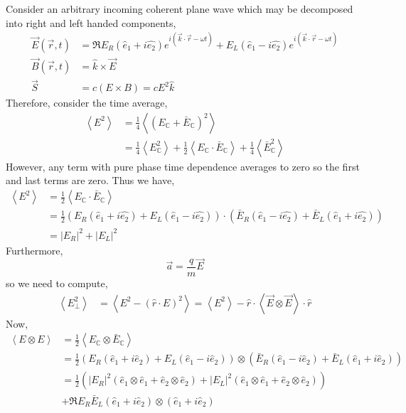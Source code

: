 \documentclass[12pt]{extarticle}
\theoremstyle{definition}
\newcommand{\C}{\mathbb{C}}
\begin{document}
Consider an arbitrary incoming coherent plane wave which may be decomposed into right and left handed components,
\begin{align*}
\vec{E}(\vec{r}, t) & = \Re{  E_R  (\hat{e}_1 + i \hat{e_2}) e^{i (\vec{k} \cdot \vec{r} - \omega t)} + E_L (\hat{e}_1 - i \hat{e_2}) e^{i (\vec{k} \cdot \vec{r} - \omega t)} }
\\
\vec{B}(\vec{r}, t) & = \hat{k} \times \vec{E}
\\
\vec{S} & = c ( E \times B) = c E^2 \hat{k} 
\end{align*}
Therefore, consider the time average,
\begin{align*}
\left< E^2 \right> & = \tfrac{1}{4} \left< (E_\C + \bar{E}_\C)^2 \right>
\\
& = \tfrac{1}{4} \left< E_\C^2 \right> + \tfrac{1}{2} \left< E_\C \cdot \bar{E}_\C \right> + \tfrac{1}{4} \left< \bar{E}_\C^2 \right>
\end{align*}
However, any term with pure phase time dependence averages to zero so the first and last terms are zero. Thus we have,
\begin{align*}
\left< E^2 \right> & = \tfrac{1}{2} \left< E_\C \cdot \bar{E}_\C \right> 
\\
& = \tfrac{1}{2} \left( E_R (\hat{e}_1 + i \hat{e_2})  + E_L (\hat{e}_1 - i \hat{e_2}) \right) \cdot \left( \bar{E}_R (\hat{e}_1 - i \hat{e_2})  + \bar{E}_L (\hat{e}_1 + i \hat{e_2}) \right)  
\\
& = |E_R|^2 + |E_L|^2
\end{align*}
Furthermore,
\[ \vec{a} = \frac{q}{m} \vec{E} \]
so we need to compute,
\begin{align*}
\left< E_\perp^2 \right> & = \left< E^2 - (\hat{r} \cdot E)^2  \right> = \left< E^2 \right> - \hat{r} \cdot \left< \vec{E} \otimes \vec{E} \right> \cdot \hat{r}
\end{align*}
Now,
\begin{align*}
\left< E \otimes E \right> & = \tfrac{1}{2} \left< E_\C \otimes \bar{E}_\C \right> 
\\
& = \tfrac{1}{2} \left( E_R (\hat{e}_1 + i \hat{e}_2) + E_L (\hat{e}_1 - i \hat{e}_2) \right) \otimes \left( \bar{E}_R (\hat{e}_1 - i \hat{e}_2)  + \bar{E}_L (\hat{e}_1 + i \hat{e}_2) \right)  
\\
& = \tfrac{1}{2} \left( |E_R|^2 (\hat{e}_1 \otimes \hat{e}_1 + \hat{e}_2 \otimes \hat{e}_2) + |E_L|^2 (\hat{e}_1 \otimes \hat{e}_1 + \hat{e}_2 \otimes \hat{e}_2)  \right)
\\
& + \Re{ E_R \bar{E}_L (\hat{e}_1  + i \hat{e}_2) \otimes (\hat{e}_1 + i \hat{e}_2) }
\end{align*}
\end{document}
